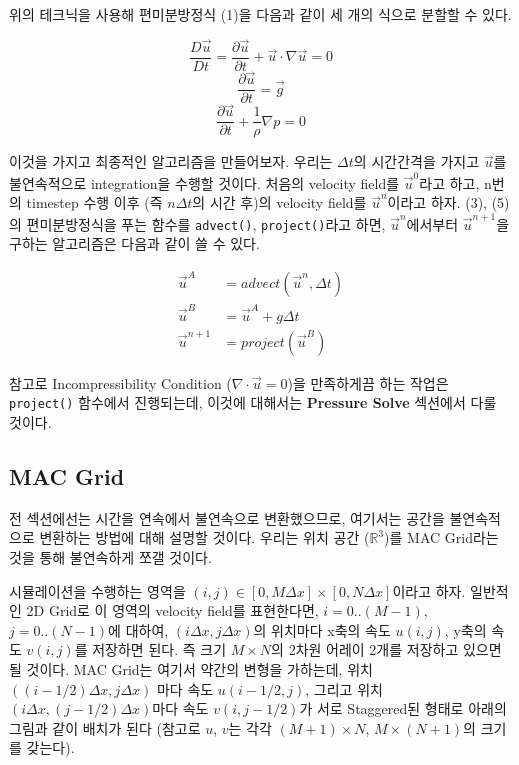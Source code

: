 \documentclass[12pt, A4]{article}
\begin{document}
위의 테크닉을 사용해 편미분방정식 (1)을 다음과 같이 세 개의 식으로 분할할 수 있다.

\begin{equation}
  \frac{D\vec{u}}{Dt} = \frac{\partial \vec{u}}{\partial t} + \vec{u} \cdot \nabla \vec{u} = 0
\end{equation}
\begin{equation}
  \frac{\partial \vec{u}}{\partial t} = \vec{g}
\end{equation}
\begin{equation}
  \frac{\partial \vec{u}}{\partial t} + \frac{1}{\rho} \nabla p = 0
\end{equation}

이것을 가지고 최종적인 알고리즘을 만들어보자.
우리는 $\Delta t$의 시간간격을 가지고 $\vec{u}$를 불연속적으로 integration을 수행할 것이다. 처음의 velocity field를 $\vec{u}^0$라고 하고, n번의 timestep 수행 이후 (즉 $n \Delta t$의 시간 후)의 velocity field를 $\vec{u}^n$이라고 하자. (3), (5)의 편미분방정식을 푸는 함수를 \texttt{advect()}, \texttt{project()}라고 하면, $\vec{u}^n$에서부터 $\vec{u}^{n+1}$을 구하는 알고리즘은 다음과 같이 쓸 수 있다. \cite[p.20]{fluid-sim-cg}

\begin{align}
  \vec{u}^A &= advect(\vec{u}^n, \Delta t) \\
  \vec{u}^B &= \vec{u}^A + g \Delta t \\
  \vec{u}^{n+1} &= project(\vec{u}^B)
\end{align}

참고로 Incompressibility Condition ($\nabla \cdot \vec{u} = 0$)을 만족하게끔 하는 작업은 \texttt{project()} 함수에서 진행되는데, 이것에 대해서는 \textbf{Pressure Solve} 섹션에서 다룰 것이다.

\subsection{MAC Grid}

전 섹션에선는 시간을 연속에서 불연속으로 변환했으므로, 여기서는 공간을 불연속적으로 변환하는 방법에 대해 설명할 것이다. 우리는 위치 공간 ($\mathbb{R}^3$)를 MAC Grid라는 것을 통해 불연속하게 쪼갤 것이다. \cite[p.21-25]{fluid-sim-cg}

시뮬레이션을 수행하는 영역을 $(i, j) \in [0, M \Delta x] \times [0, N \Delta x]$이라고 하자. 일반적인 2D Grid로 이 영역의 velocity field를 표현한다면, $i = 0..(M-1)$, $j = 0..(N-1)$에 대하여,  $(i \Delta x, j \Delta x)$의 위치마다 x축의 속도 $u(i, j)$, y축의 속도 $v(i, j)$를 저장하면 된다. 즉 크기 $M \times N$의 2차원 어레이 2개를 저장하고 있으면 될 것이다. MAC Grid는 여기서 약간의 변형을 가하는데, 위치 $((i-1/2) \Delta x, j \Delta x)$ 마다 속도 $u(i-1/2, j)$, 그리고 위치 $(i \Delta x, (j-1/2) \Delta x)$마다 속도 $v(i,j-1/2)$가 서로 Staggered된 형태로 아래의 그림과 같이 배치가 된다 (참고로 $u$, $v$는 각각 $(M+1) \times N$, $M \times (N+1)$의 크기를 갖는다).
\end{document}
